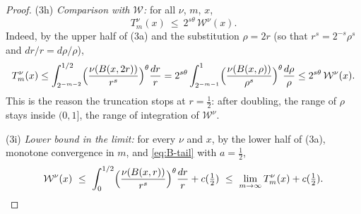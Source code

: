 \documentclass[12pt,oneside,a4paper]{article}
\theoremstyle{mytheorem}
\theoremstyle{remark}
\theoremstyle{definition}
\begin{document}
\begin{proof}
\textup{(3h)} \emph{Comparison with $\mathcal{W}$:} for all $\nu$, $m$,
$x$,
\begin{equation}\label{eq:B-TleW}
 T^\nu_m(x)\ \le\ 2^{s\theta}\,\mathcal{W}^\nu(x).
\end{equation}
Indeed, by the upper half of (3a) and the substitution $\rho=2r$ (so
that $r^s=2^{-s}\rho^s$ and $dr/r=d\rho/\rho$),
\[
 T^\nu_m(x)
 \le\int_{2^{-m-2}}^{1/2}\Bigl(\frac{\nu(B(x,2r))}{r^s}\Bigr)^{\theta}\frac{dr}{r}
 =2^{s\theta}\int_{2^{-m-1}}^{1}\Bigl(\frac{\nu(B(x,\rho))}{\rho^s}\Bigr)^{\theta}\frac{d\rho}{\rho}
 \le2^{s\theta}\,\mathcal{W}^\nu(x).
\]
This is the reason the truncation stops at $r=\tfrac12$: after
doubling, the range of $\rho$ stays inside $(0,1]$, the range of
integration of $\mathcal{W}^\nu$.

\textup{(3i)} \emph{Lower bound in the limit:} for every $\nu$ and
$x$, by the lower half of (3a), monotone convergence in $m$, and
\eqref{eq:B-tail} with $a=\tfrac12$,
\[
 \mathcal{W}^\nu(x)
 \ \le\ \int_0^{1/2}\Bigl(\frac{\nu(B(x,r))}{r^s}\Bigr)^{\theta}\frac{dr}{r}+c(\tfrac12)
 \ \le\ \lim_{m\to\infty}T^\nu_m(x)+c(\tfrac12).
\]


\end{proof}
\end{document}
